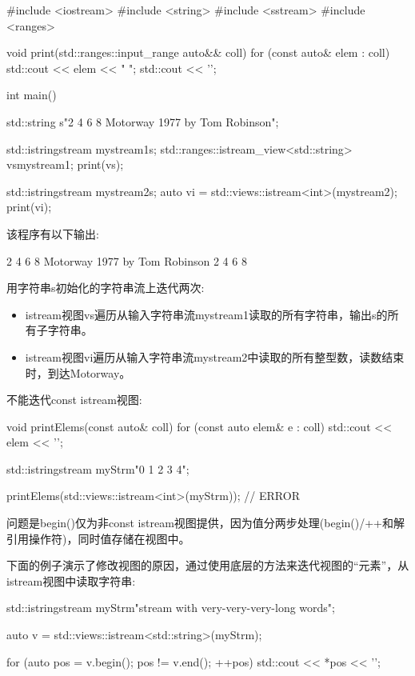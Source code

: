 \begin{cpp}
#include <iostream>
#include <string>
#include <sstream>
#include <ranges>

void print(std::ranges::input_range auto&& coll)
{
	for (const auto& elem : coll) {
		std::cout << elem << " ";
	}
	std::cout << '\n';
}

int main()
{
	std::string s{"2 4 6 8 Motorway 1977 by Tom Robinson"};
	
	std::istringstream mystream1{s};
	std::ranges::istream_view<std::string> vs{mystream1};
	print(vs);
	
	std::istringstream mystream2{s};
	auto vi = std::views::istream<int>(mystream2);
	print(vi);
}
\end{cpp}

该程序有以下输出:

\begin{shell}
2 4 6 8 Motorway 1977 by Tom Robinson
2 4 6 8
\end{shell}

用字符串s初始化的字符串流上迭代两次:

\begin{itemize}
\item
istream视图vs遍历从输入字符串流mystream1读取的所有字符串，输出s的所有子字符串。

\item
istream视图vi遍历从输入字符串流mystream2中读取的所有整型数，读数结束时，到达Motorway。
\end{itemize}


不能迭代const istream视图:

\begin{cpp}
void printElems(const auto& coll) {
	for (const auto elem& e : coll) {
		std::cout << elem << '\n';
	}
}

std::istringstream myStrm{"0 1 2 3 4"};

printElems(std::views::istream<int>(myStrm)); // ERROR
\end{cpp}

问题是begin()仅为非const istream视图提供，因为值分两步处理(begin()/++和解引用操作符)，同时值存储在视图中。

下面的例子演示了修改视图的原因，通过使用底层的方法来迭代视图的“元素”，从istream视图中读取字符串:

\begin{cpp}
std::istringstream myStrm{"stream with very-very-very-long words"};

auto v = std::views::istream<std::string>(myStrm);

for (auto pos = v.begin(); pos != v.end(); ++pos) {
	std::cout << *pos << '\n';
}
\end{cpp}

